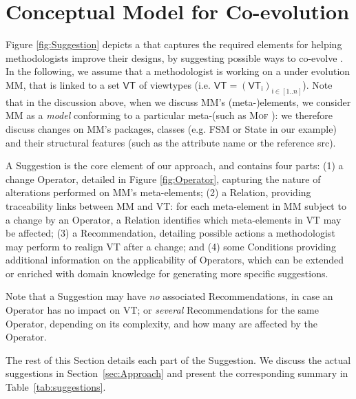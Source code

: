\section{Conceptual Model for \Viewtype Co-evolution}
\label{sec:Suggestion}

Figure \ref{fig:Suggestion} depicts a \metamodel that captures the
required elements for helping methodologists improve their \viewtype designs,
by suggesting possible ways to co-evolve \viewtypes.
In the following, we assume that a methodologist is working on a \metamodel
under evolution \textsf{MM}, that is linked to a set $\mathsf{VT}$ of viewtypes
(i.e. $\mathsf{VT} = (\mathsf{VT}_\mathsf{i})_{\mathsf{i}\in [1..n]}$). Note that in the discussion above, when we discuss
\textsf{MM}'s (meta-)elements, we consider \textsf{MM} as a \emph{model}
conforming to a particular meta-\metamodel (such as \textsc{Mof} \cite{TR:OMG-MOF:2016}):
we therefore discuss changes on \textsf{MM}'s packages, classes (e.g. 
\textsf{FSM} or \textsf{State} in our example) and their structural features
(such as the attribute \textsf{name} or the reference \textsf{src}).

A \textsf{Suggestion} is the core element of our approach, and contains four 
parts: (1) a change \textsf{Operator}, detailed in Figure \ref{fig:Operator}, 
capturing the nature of alterations performed on \textsf{MM}'s meta-elements; 
(2) a \textsf{Relation}, providing traceability links between \textsf{MM} 
and \textsf{VT}: for each meta-element in \textsf{MM} subject to a 
change by an \textsf{Operator}, a \textsf{Relation} identifies which 
meta-elements in \textsf{VT} may be affected;
(3) a \textsf{Recommendation}, detailing possible actions a methodologist 
may perform to realign \textsf{VT} after a change; and 
(4) some \textsf{Condition}s providing additional information on the applicability
of \textsf{Operator}s, which can be extended or enriched with domain knowledge 
for generating more specific suggestions.


Note that a \textsf{Suggestion} may 
have \emph{no} associated \textsf{Recommendation}s, in case an \textsf{Operator} has no
impact on \textsf{VT}; or \emph{several} \textsf{Recommendation}s for the same 
\textsf{Operator}, depending on its complexity, and how many \viewtypes are 
affected by the \textsf{Operator}.

The rest of this Section details each part of the \textsf{Suggestion}. We discuss the actual suggestions in Section~\ref{sec:Approach} and present the corresponding summary in Table~\ref{tab:suggestions}.



